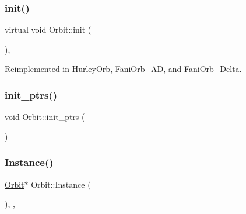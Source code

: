 \mbox{\label{class_orbit_ab92aeb9474f9aa26ea000ed2ea8c2c8c}} 
\subsubsection{\texorpdfstring{init()}{init()}}
{\footnotesize\ttfamily virtual void Orbit\+::init (\begin{DoxyParamCaption}{ }\end{DoxyParamCaption})\hspace{0.3cm}{\ttfamily [inline]}, {\ttfamily [virtual]}}



Reimplemented in \hyperlink{class_hurley_orb_afba6609e2719852d8cf13b5046be6128}{Hurley\+Orb}, \hyperlink{class_fani_orb___a_d_ad75ffb0402507df987305b7a79c8a8d0}{Fani\+Orb\+\_\+\+AD}, and \hyperlink{class_fani_orb___delta_aaec6b2158b730146f8b7bca6edb71c35}{Fani\+Orb\+\_\+\+Delta}.

\mbox{\label{class_orbit_adc6b998a131e9576ee1723b60f4e614f}} 
\subsubsection{\texorpdfstring{init\+\_\+ptrs()}{init\_ptrs()}}
{\footnotesize\ttfamily void Orbit\+::init\+\_\+ptrs (\begin{DoxyParamCaption}{ }\end{DoxyParamCaption})}

\mbox{\label{class_orbit_a814a77820afd104edbd08f955b123cb4}} 
\subsubsection{\texorpdfstring{Instance()}{Instance()}}
{\footnotesize\ttfamily \hyperlink{class_orbit}{Orbit}$\ast$ Orbit\+::\+Instance (\begin{DoxyParamCaption}{ }\end{DoxyParamCaption})\hspace{0.3cm}{\ttfamily [inline]}, {\ttfamily [override]}, {\ttfamily [virtual]}}



